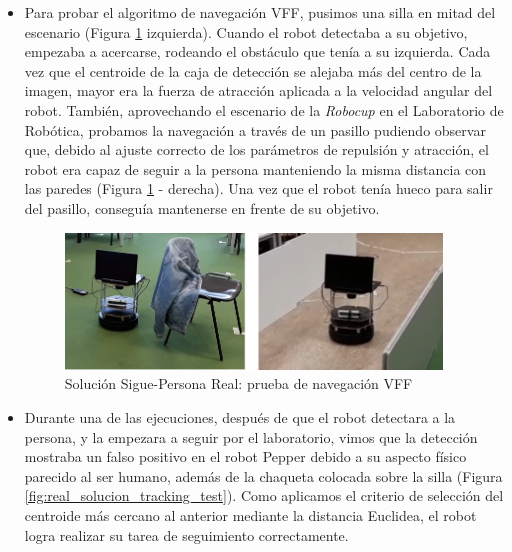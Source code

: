 \begin{itemize}
	\item Para probar el algoritmo de navegación VFF, pusimos una silla en mitad del escenario (Figura \ref{fig:real_solucion_vff_test} izquierda). Cuando el robot detectaba a su objetivo, empezaba a acercarse, rodeando el obstáculo que tenía a su izquierda. Cada vez que el centroide de la caja de detección se alejaba más del centro de la imagen, mayor era la fuerza de atracción aplicada a la velocidad angular del robot. También, aprovechando el escenario de la \textit{Robocup} en el Laboratorio de Robótica, probamos la navegación a través de un pasillo pudiendo observar que, debido al ajuste correcto de los parámetros de repulsión y atracción, el robot era capaz de seguir a la persona manteniendo la misma distancia con las paredes (Figura \ref{fig:real_solucion_vff_test} - derecha). Una vez que el robot tenía hueco para salir del pasillo, conseguía mantenerse en frente de su objetivo.
	
	\begin{figure} [H]
		\begin{center}
		\includegraphics[width=10cm]{imagenes/cap6/real-solucion-vff-test.png}
		\end{center}
		\caption[Solución Sigue-Persona Real: prueba de navegación VFF]{Solución Sigue-Persona Real: prueba de navegación VFF}
		\label{fig:real_solucion_vff_test}
	\end{figure}
	
	\item Durante una de las ejecuciones, después de que el robot detectara a la persona, y la empezara a seguir por el laboratorio, vimos que la detección mostraba un falso positivo en el robot Pepper debido a su aspecto físico parecido al ser humano, además de la chaqueta colocada sobre la silla (Figura \ref{fig:real_solucion_tracking_test}). Como aplicamos el criterio de selección del centroide más cercano al anterior mediante la distancia Euclidea, el robot logra realizar su tarea de seguimiento correctamente.
	

\end{itemize}
